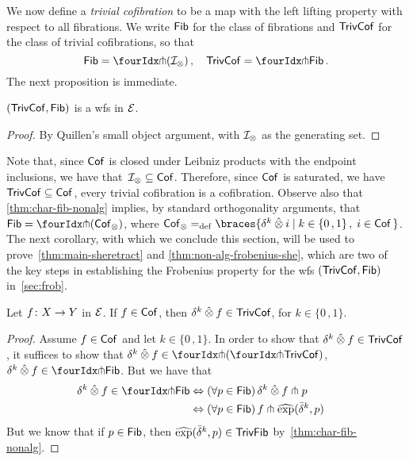 \documentclass[reqno,10pt,a4paper,oneside,draft]{amsart}
\begin{document}
We now define a \emph{trivial cofibration} to be a map with the left lifting property with respect to all fibrations.
We write $\Fib$ for the class of fibrations and $\TrivCof$ for the class of trivial cofibrations, so that 
\[
\Fib = \liftr{(\cal{I}_\otimes)} \, , \quad \TrivCof = \liftl{\Fib} \, .
\]
The next proposition is immediate. 

\begin{proposition} \label{thm:wfstimes}
$(\TrivCof, \Fib)$ is a wfs in $\cal{E}$.
\end{proposition}

\begin{proof} By Quillen's small object argument, with $\cal{I}_\otimes$ as the generating set. 
\end{proof} 

Note that, since $\Cof$ is closed under Leibniz products with the endpoint inclusions, we have that~$\cal{I}_\otimes \subseteq \Cof$. Therefore, since $\Cof$ is saturated, we have $\TrivCof \subseteq \Cof$, \ie every trivial cofibration is a cofibration.
Observe also that \cref{thm:char-fib-nonalg} implies, by standard orthogonality arguments, that $\Fib = \liftr{(\Cof_\otimes)}$, where 
$\Cof_\otimes \defeq \braces{\delta^k \hatotimes i \mid  k \in \{ 0 \, , 1 \} \, , \;  i \in \Cof \,  }$. The next corollary, with which we conclude this section, will be used to prove~\cref{thm:main-sheretract} and \cref{thm:non-alg-frobenius-she}, which are two of the key
steps in establishing the Frobenius property for the wfs $(\TrivCof, \Fib)$ in~\cref{sec:frob}. 

\begin{corollary} 
\label{thm:kcyl-of-cof-is-trivcof-non-alg} Let $f \co X \to Y$ in $\cal{E}$. 
If $f \in \Cof$, then $\kcyl \hatotimes f \in \TrivCof$, for $k \in \{0 \, , 1 \}$.
\end{corollary}

\begin{proof} Assume $f \in \Cof$ and let $k \in \{0 \,, 1 \}$. In order to show that $\kcyl \hatotimes f \in \TrivCof$, it suffices to show that  $\kcyl \hatotimes f \in \liftl{( \liftr{\TrivCof})}$, \ie $\kcyl \hatotimes f \in \liftl{\Fib}$. But we have that 
\begin{alignat*}{2} 
\kcyl \hatotimes f \in  \liftl{\Fib} 
& \Leftrightarrow (\forall p \in \Fib) \, \kcyl \hatotimes f  \pitchfork p & \\ 
& \Leftrightarrow (\forall p \in \Fib) \, f  \pitchfork \hatexp(\bar{\delta}^k, p) & 
\end{alignat*}
But we know that if $p \in \Fib$, then $ \hatexp(\bar{\delta}^k, p) \in \TrivFib$ by~\cref{thm:char-fib-nonalg}. 
\end{proof} 
\end{document}
